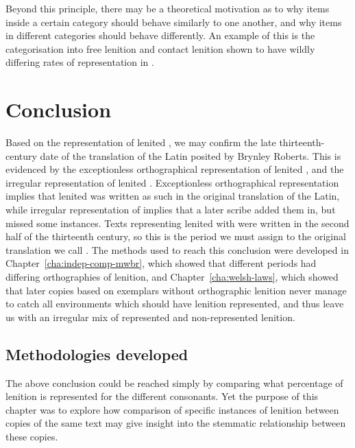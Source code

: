 Beyond this principle, there may be a theoretical motivation as to why items inside a certain category should behave similarly to one another, and why items in different categories should behave differently. An example of this is the categorisation into free lenition and contact lenition shown to have wildly differing rates of representation in .

\section{Conclusion}
\label{sec:dewi-conclusion}

Based on the representation of lenited , we may confirm the late thirteenth-century date of the translation of the Latin  posited by Brynley Roberts. This is evidenced by the exceptionless orthographical representation of lenited , and the irregular representation of lenited . Exceptionless orthographical representation implies that lenited  was written as such in the original translation of the Latin, while irregular representation of  implies that a later scribe added them in, but missed some instances. Texts representing lenited  with  were written in the second half of the thirteenth century, so this is the period we must assign to the original translation we call . The methods used to reach this conclusion were developed in Chapter~\ref{cha:indep-comp-mwbr}, which showed that different periods had differing orthographies of lenition, and Chapter~\ref{cha:welsh-laws}, which showed that later copies based on exemplars without orthographic lenition never manage to catch all environments which should have lenition represented, and thus leave us with an irregular mix of represented and non-represented lenition.

\subsection{Methodologies developed}
\label{sec:meth-devel}

The above conclusion could be reached simply by comparing what percentage of lenition is represented for the different consonants. Yet the purpose of this chapter was to explore how comparison of specific instances of lenition between copies of the same text may give insight into the stemmatic relationship between these copies.

